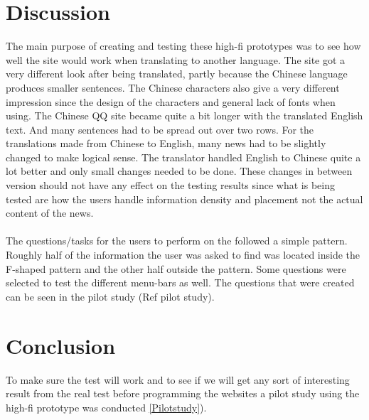 \section{Discussion}
The main purpose of creating and testing these high-fi prototypes was to see how well the site would work when translating to another language. The site got a very different look after being translated, partly because the Chinese language produces smaller sentences. The Chinese characters also give a very different impression since the design of the characters and general lack of fonts when using. The Chinese QQ site became quite a bit longer with the translated English text. And many sentences had to be spread out over two rows. For the translations made from Chinese to English, many news had to be slightly changed to make logical sense. The translator handled English to Chinese quite a lot better and only small changes needed to be done. These changes in between version should not have any effect on the testing results since what is being tested are how the users handle information density and placement not the actual content of the news.
\\\\
 The questions/tasks for the users to perform on the followed a simple pattern. Roughly half of the information the user was asked to find was located inside the F-shaped pattern and the other half outside the pattern. Some questions were selected to test the different menu-bars as well. The questions that were created can be seen in the pilot study (Ref pilot study).


\section{Conclusion}
To make sure the test will work and to see if we will get any sort of interesting result from the real test before programming the websites a pilot study using the high-fi prototype was conducted \ref{Pilotstudy}).



